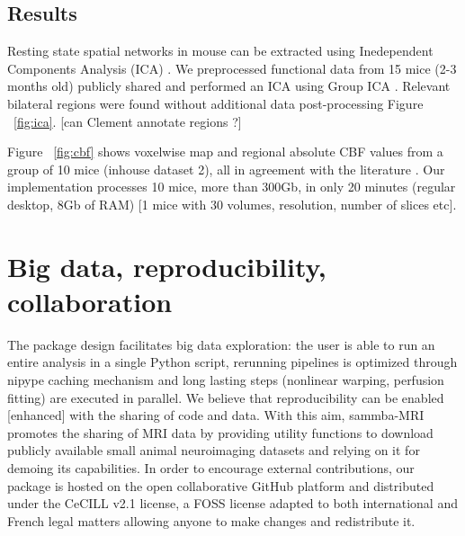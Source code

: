 \documentclass[utf8, a4paper, final, crop]{frontiersSCNS} %
\begin{document}
\subsection{Results}

Resting state spatial networks in mouse can be extracted using Inedependent Components Analysis (ICA) \citep{zerbi2015mapping, grandjean2019common}. We preprocessed functional data
from 15 mice (2-3 months old) publicly shared
\citep{zerbi2015mapping} and performed an ICA using Group ICA 
\citep{varoquaux2010group}. Relevant bilateral
regions were found without additional data post-processing Figure ~\ref{fig:ica}. [can Clement annotate regions ?]

Figure ~\ref{fig:cbf} shows voxelwise map and regional absolute CBF values from a group of 10 mice (inhouse dataset 2), all 
in agreement with the literature \citep{muir2008cerebral}. Our implementation processes 10 mice, more than 
300Gb, in only 20 minutes (regular desktop, 8Gb of RAM) [1 mice with 30 volumes, resolution, number of slices 
etc].

\section{Big data, reproducibility, collaboration}
The package design facilitates big data exploration: the user is able to run an 
entire analysis in a single Python script, rerunning pipelines is optimized 
through nipype caching mechanism and long lasting steps (nonlinear warping, perfusion 
fitting) are executed in parallel.
%
We believe that reproducibility can be enabled [enhanced] with the sharing of code
and data.
%
With %
this aim, sammba-MRI promotes the sharing of MRI data by providing 
utility functions to download publicly available small animal neuroimaging 
datasets and relying on it for demoing its capabilities.
In order to encourage external contributions, our package is hosted on the open 
collaborative GitHub platform
and distributed under the CeCILL v2.1 license, a FOSS license adapted to both international and French legal matters 
allowing anyone to make changes and redistribute it. 



%
%
%
%
\end{document}
